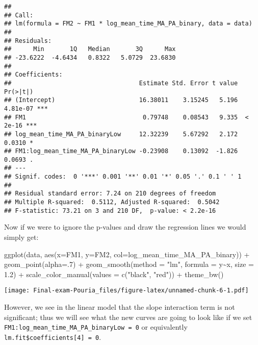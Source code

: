 \documentclass[
]{article}
\newenvironment{Shaded}{\begin{snugshade}}{\end{snugshade}}
\newcommand{\AttributeTok}[1]{\textcolor[rgb]{0.77,0.63,0.00}{#1}}
\newcommand{\DecValTok}[1]{\textcolor[rgb]{0.00,0.00,0.81}{#1}}
\newcommand{\FloatTok}[1]{\textcolor[rgb]{0.00,0.00,0.81}{#1}}
\newcommand{\FunctionTok}[1]{\textcolor[rgb]{0.00,0.00,0.00}{#1}}
\newcommand{\NormalTok}[1]{#1}
\newcommand{\SpecialCharTok}[1]{\textcolor[rgb]{0.00,0.00,0.00}{#1}}
\newcommand{\StringTok}[1]{\textcolor[rgb]{0.31,0.60,0.02}{#1}}
\begin{document}
\begin{verbatim}
## 
## Call:
## lm(formula = FM2 ~ FM1 * log_mean_time_MA_PA_binary, data = data)
## 
## Residuals:
##      Min       1Q   Median       3Q      Max 
## -23.6222  -4.6434   0.8322   5.0729  23.6830 
## 
## Coefficients:
##                                   Estimate Std. Error t value Pr(>|t|)    
## (Intercept)                       16.38011    3.15245   5.196 4.81e-07 ***
## FM1                                0.79748    0.08543   9.335  < 2e-16 ***
## log_mean_time_MA_PA_binaryLow     12.32239    5.67292   2.172   0.0310 *  
## FM1:log_mean_time_MA_PA_binaryLow -0.23908    0.13092  -1.826   0.0693 .  
## ---
## Signif. codes:  0 '***' 0.001 '**' 0.01 '*' 0.05 '.' 0.1 ' ' 1
## 
## Residual standard error: 7.24 on 210 degrees of freedom
## Multiple R-squared:  0.5112, Adjusted R-squared:  0.5042 
## F-statistic: 73.21 on 3 and 210 DF,  p-value: < 2.2e-16
\end{verbatim}

Now if we were to ignore the p-values and draw the regression lines we
would simply get:

\begin{Shaded}
\begin{Highlighting}[]
\FunctionTok{ggplot}\NormalTok{(data, }\FunctionTok{aes}\NormalTok{(}\AttributeTok{x=}\NormalTok{FM1, }\AttributeTok{y=}\NormalTok{FM2, }\AttributeTok{col=}\NormalTok{log\_mean\_time\_MA\_PA\_binary)) }\SpecialCharTok{+}
  \FunctionTok{geom\_point}\NormalTok{(}\AttributeTok{alpha=}\NormalTok{.}\DecValTok{7}\NormalTok{) }\SpecialCharTok{+}
  \FunctionTok{geom\_smooth}\NormalTok{(}\AttributeTok{method =} \StringTok{"lm"}\NormalTok{, }\AttributeTok{formula =}\NormalTok{ y}\SpecialCharTok{\textasciitilde{}}\NormalTok{x, }\AttributeTok{size =} \FloatTok{1.2}\NormalTok{) }\SpecialCharTok{+}
  \FunctionTok{scale\_color\_manual}\NormalTok{(}\AttributeTok{values =} \FunctionTok{c}\NormalTok{(}\StringTok{"black"}\NormalTok{, }\StringTok{"red"}\NormalTok{)) }\SpecialCharTok{+}
  \FunctionTok{theme\_bw}\NormalTok{()}
\end{Highlighting}
\end{Shaded}

\texttt{[image: Final-exam-Pouria\_files/figure-latex/unnamed-chunk-6-1.pdf]}

However, we see in the linear model that the slope interaction term is
not significant; thus we will see what the new curves are going to look
like if we set \texttt{FM1:log\_mean\_time\_MA\_PA\_binaryLow\ =\ 0} or
equivalently \texttt{lm.fit\$coefficients{[}4{]}\ =\ 0}.
\end{document}

